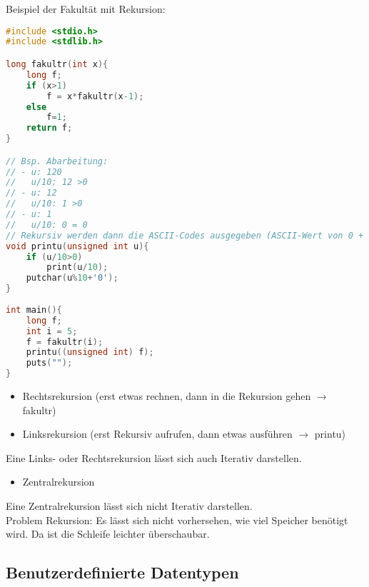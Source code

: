 Beispiel der Fakultät mit Rekursion:
\begin{lstlisting}[language=C]
#include <stdio.h>
#include <stdlib.h>

long fakultr(int x){
	long f;
	if (x>1) 
		f = x*fakultr(x-1);
	else 
		f=1;
	return f;
}

// Bsp. Abarbeitung:
// - u: 120
//   u/10: 12 >0
// - u: 12 
//   u/10: 1 >0
// - u: 1
//   u/10: 0 = 0
// Rekursiv werden dann die ASCII-Codes ausgegeben (ASCII-Wert von 0 + Zahl)
void printu(unsigned int u){
	if (u/10>0)
		print(u/10);
	putchar(u%10+'0');
}
	
int main(){
	long f;
	int i = 5;
	f = fakultr(i);
	printu((unsigned int) f);
	puts("");
}
\end{lstlisting}
\begin{itemize}
\item Rechtsrekursion (erst etwas rechnen, dann in die Rekursion gehen $\rightarrow$ fakultr)
\item Linksrekursion (erst Rekursiv aufrufen, dann etwas ausführen $\rightarrow$ printu)
\end{itemize}
Eine Links- oder Rechtsrekursion lässt sich auch Iterativ darstellen.
\begin{itemize}
\item Zentralrekursion
\end{itemize}
Eine Zentralrekursion lässt sich nicht Iterativ darstellen.\medskip\\
Problem Rekursion: Es lässt sich nicht vorhersehen, wie viel Speicher benötigt wird. Da ist die Schleife leichter überschaubar.

\subsection{Benutzerdefinierte Datentypen}

